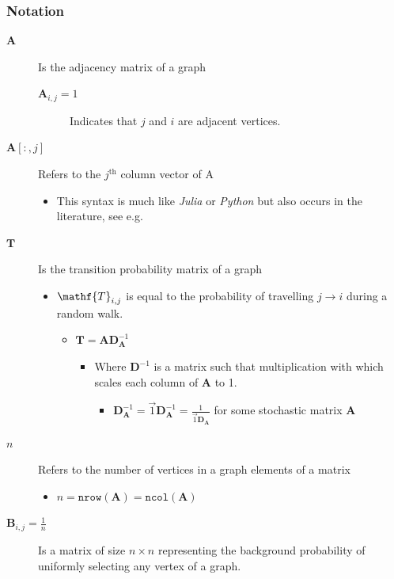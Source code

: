 \documentclass[11pt]{article}
\begin{document}
\subsubsection{Notation}
\label{notation}
\begin{description}
\item[{\(\mathbf{A}\)}] Is the adjacency matrix of a graph
\begin{description}
\item[{\(\mathbf{A}_{i,j} = 1\)}] Indicates that \(j\) and \(i\) are adjacent vertices.
\end{description}
\item[{\(\mathbf{A}\left[:,j\right]\)}] Refers to the \(j^{\mathrm{th}}\) column vector of \(\mathrm{A}\)
\begin{itemize}
\item This syntax is much like \emph{Julia} or \emph{Python} but also occurs in the literature, see e.g. \cite[.8]{golubMatrixComputations1996}
\end{itemize}
\item[{\(\mathbf{T}\)}] Is the transition probability matrix of a graph
\begin{itemize}
\item \(\mathf{T}_{i,j}\) is equal to the probability of travelling \(j \rightarrow  i\) during a random walk.
\begin{itemize}
\item \(\mathbf{T} = \mathbf{A} \mathbf{D}_{\mathbf{A}}^{-1}\)
\begin{itemize}
\item Where \(\mathbf{D}^{-1}\) is a matrix such that multiplication with which scales each column of \(\mathbf{A}\) to 1.
\begin{itemize}
\item \(\mathbf{D}^{-1}_{\mathbf{A}} = \vec{1}\mathbf{D}^{-1}_{\mathbf{A}} = \frac{1}{\vec{1}\mathbf{D}_{\mathbf{A}}}\) for some stochastic matrix \(\mathbf{A}\)
\end{itemize}
\end{itemize}
\end{itemize}
\end{itemize}
\item[{\(n\)}] Refers to the number of vertices in a graph elements of a matrix
\begin{itemize}
\item \(n = \mathtt{nrow}\left(\mathbf{A}\right) = \mathtt{ncol}\left(\mathbf{A}\right)\)
\end{itemize}
\item[{\(\mathbf{B}_{i,j} = \frac{1}{n}\)}] Is a matrix of size \(n\times n\) representing the background probability of uniformly selecting any vertex of a graph.

\end{description}
\end{document}
